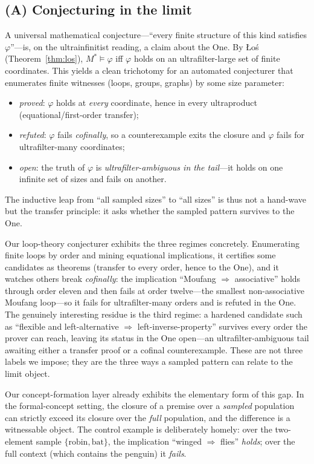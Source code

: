 \documentclass[]{article}
\theoremstyle{definition}
\theoremstyle{remark}
\newcommand{\limstar}{\ensuremath{M^{\!*}}}
\begin{document}
\subsection{(A) Conjecturing in the limit}
\label{sec:teethA}

A universal mathematical conjecture---``every finite structure of this kind
satisfies $\varphi$''---is, on the ultrainfinitist reading, a claim about the One.
By {\L}o\'s (Theorem~\ref{thm:los}), $\limstar\models\varphi$ iff $\varphi$ holds
on an ultrafilter-large set of finite coordinates. This yields a clean trichotomy
for an automated conjecturer that enumerates finite witnesses (loops, groups,
graphs) by some size parameter:
\begin{itemize}
\item \emph{proved}: $\varphi$ holds at \emph{every} coordinate, hence in every
ultraproduct (equational/first-order transfer);
\item \emph{refuted}: $\varphi$ fails \emph{cofinally}, so a counterexample exits
the closure and $\varphi$ fails for ultrafilter-many coordinates;
\item \emph{open}: the truth of $\varphi$ is \emph{ultrafilter-ambiguous in the
tail}---it holds on one infinite set of sizes and fails on another.
\end{itemize}
The inductive leap from ``all sampled sizes'' to ``all sizes'' is thus not a
hand-wave but the transfer principle: it asks whether the sampled pattern survives
to the One.

Our loop-theory conjecturer exhibits the three regimes concretely. Enumerating
finite loops by order and mining equational implications, it certifies some
candidates as theorems (transfer to every order, hence to the One), and it watches
others break \emph{cofinally}: the implication ``Moufang $\Rightarrow$
associative'' holds through order eleven and then fails at order twelve---the
smallest non-associative Moufang loop---so it fails for ultrafilter-many orders and
is refuted in the One. The genuinely interesting residue is the third regime: a
hardened candidate such as ``flexible and left-alternative $\Rightarrow$
left-inverse-property'' survives every order the prover can reach, leaving its
status in the One open---an ultrafilter-ambiguous tail awaiting either a transfer
proof or a cofinal counterexample. These are not three labels we impose; they are
the three ways a sampled pattern can relate to the limit object.

Our concept-formation layer already exhibits the elementary form of this gap. In
the formal-concept setting, the closure of a premise over a \emph{sampled}
population can strictly exceed its closure over the \emph{full} population, and the
difference is a witnessable object. The control example is deliberately homely:
over the two-element sample $\{\text{robin}, \text{bat}\}$, the implication
``winged $\Rightarrow$ flies'' \emph{holds}; over the full context (which contains
the penguin) it \emph{fails}.
\end{document}
